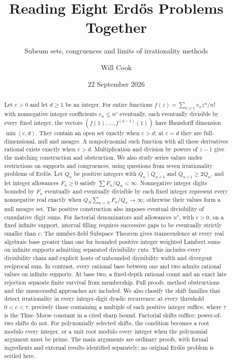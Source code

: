 \documentclass[11pt]{article}
\title{Reading Eight Erd\H{o}s Problems Together}
\subtitle{Subsum sets, congruences and limits of irrationality methods}
\author{Will Cook}
\date{22 September 2026}
\begin{document}
\maketitle
\noteprovenance
\begin{abstract}
Let $c>0$ and let $d\ge1$ be an integer. For entire functions
$f(z)=\sum_{n\ge1}e_nz^n/n!$ with nonnegative integer
coefficients $e_n\le n^c$ eventually, each eventually divisible by every fixed
integer, the vectors $(f(1),\ldots,f^{(d-1)}(1))$ have Hausdorff dimension
$\min(c,d)$. They contain an open set exactly when $c>d$; at $c=d$ they are
full-dimensional, null and meagre. A nonpolynomial such function with all
these derivatives rational exists exactly when $c>d$. Multiplication and
division by powers of $z-1$ give the matching construction and obstruction.
We also study series values under restrictions on supports and congruences,
using questions from seven irrationality problems of Erd\H{o}s. Let $Q_n$ be
positive integers with $Q_n\mid Q_{n+1}$ and $Q_{n+1}\ge2Q_n$, and let integer
allowances $F_n\ge0$ satisfy $\sum F_n/Q_n<\infty$. Nonnegative integer digits
bounded by $F_n$ eventually and eventually divisible by each fixed integer
represent every nonnegative real exactly when
$Q_N\sum_{n>N}F_n/Q_n\to\infty$; otherwise their values form a null meagre set.
The positive construction also imposes eventual divisibility of cumulative
digit sums. For factorial denominators and allowances $n^c$, with $c>0$,
on a fixed infinite support, interval filling requires successive gaps to be eventually
strictly smaller than $c$.
The number-field Subspace Theorem gives transcendence at every real
algebraic base greater than one for bounded positive integer weighted
Lambert sums on infinite supports admitting separated divisibility cuts.
This includes every divisibility chain and explicit hosts of unbounded
divisibility width and divergent reciprocal sum. In contrast, every rational base between one and two admits
rational values on infinite supports. At base two, a fixed-depth rational count and an
exact late rejection separate finite survival from membership. Full proofs,
method obstructions and the unsuccessful approaches are included. We also
classify the shift families that detect irrationality in every integer-digit
dyadic recurrence: at every threshold $0<c<\tau$, precisely those containing
a multiple of each positive integer suffice, where $\tau$ is the Thue--Morse
constant in a cited sharp bound. Factorial shifts suffice; power-of-two
shifts do not. For polynomially selected shifts, the condition becomes a
root modulo every integer, or a unit root modulo every integer when the
polynomial argument must be prime. The main
arguments are ordinary proofs, with formal ingredients and external results
identified separately; no original Erd\H{o}s problem is settled here.
\end{abstract}
\end{document}
